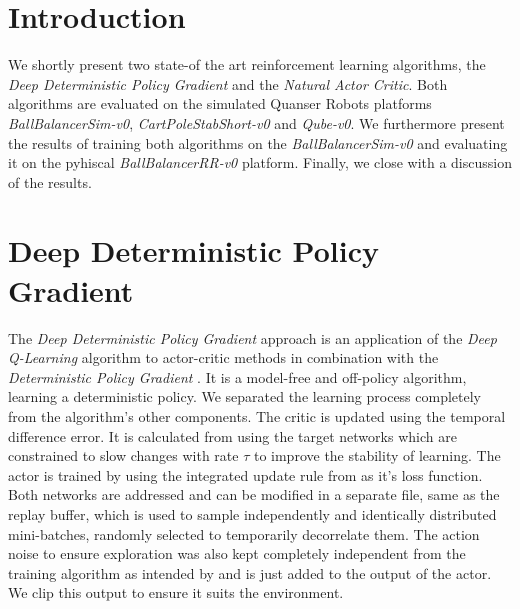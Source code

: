 
\author{Yannik Frisch \and Tabea Wilke \and Maximilian Gehrke %
}

\maketitle

\section{Introduction}
\label{sec:intro}
We shortly present two state-of the art reinforcement learning algorithms, the 
\textit{Deep Deterministic Policy Gradient} and the \textit{Natural Actor 
Critic}. Both algorithms are evaluated on the simulated Quanser Robots 
platforms \textit{BallBalancerSim-v0}, \textit{CartPoleStabShort-v0} and 
\textit{Qube-v0}. We furthermore present the results of training both 
algorithms on the \textit{BallBalancerSim-v0} and evaluating it on the pyhiscal 
\textit{BallBalancerRR-v0} platform. Finally, we close with a discussion of the 
results.
\newpage
\section{Deep Deterministic Policy Gradient}
\label{sec:ddpg}
The \textit{Deep Deterministic Policy Gradient} approach 
\citep{lillicrap2015continuous} is an application of the \textit{Deep 
Q-Learning} algorithm \citep{mnih2013playing} to actor-critic methods 
\citep{konda2000actor} in combination with the \textit{Deterministic Policy 
Gradient} \citep{silver2014deterministic}. It is a model-free and off-policy 
algorithm, learning a deterministic policy. We separated the learning process 
completely from the algorithm's other components. The critic is updated using 
the temporal difference error. It is calculated from using the target networks 
which are constrained to slow changes with rate $\tau$ to improve the stability 
of learning. The actor is trained by using the integrated update rule from 
\cite{lillicrap2015continuous} as it's loss function. Both networks are 
addressed and can be modified in a separate file, same as the replay buffer, 
which is used to sample independently and identically distributed mini-batches, 
randomly selected to temporarily decorrelate them. The action noise to ensure 
exploration was also kept completely independent from the training algorithm as 
intended by \citep{lillicrap2015continuous} and is just added to the output of 
the actor. We clip this output to ensure it suits the environment.

